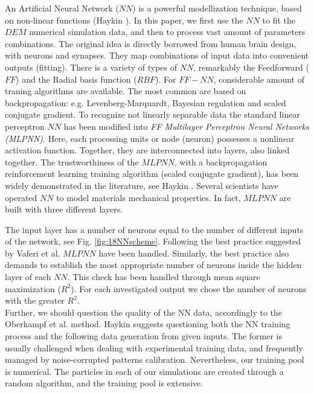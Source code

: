 An Artificial Neural Network ($NN$) is a powerful modellization technique, 
based on non-linear functions (Haykin \cite{RefWorks:158}). 
In this paper, we first use the $NN$ to fit the $DEM$ numerical simulation data, 
and then to process vast amount of parameters combinations. 
The original idea is directly borrowed from human brain design, with neurons and synapses. 
They map combinations of input data into convenient outputs (fitting). 
There is a variety of types of $NN$, remarkably the Feedforward ($FF$) 
and the Radial basis function ($RBF$). For $FF-NN$, considerable amount 
of traning algorithms are available. The most common are based on backpropagation: 
e.g. Levenberg-Marquardt, Bayesian regulation and scaled conjugate gradient. 
To recognize not linearly separable data the standard linear perceptron $NN$ 
has been modified into \textit{FF Multilayer Perceptron Neural Networks (MLPNN)}. 
Here, each processing units or node (neuron) possesses a nonlinear activation function. 
Together, they are interconnected into layers, also linked together. 
The trustworthiness of the $MLPNN$, with a backpropagation reinforcement learning 
training algorithm (scaled conjugate gradient), has been widely demonstrated in the 
literature, see Haykin \cite{RefWorks:158}. Several scientists 
\cite{RefWorks:161, RefWorks:166, RefWorks:167, RefWorks:168, RefWorks:169, RefWorks:170} 
have operated $NN$ to model materials mechanical properties. 
In fact, $MLPNN$ are built with three different layers. 

The input layer has a number of neurons equal to the number of different inputs
of the network, see Fig. \ref{fig:18NNscheme}.
Following the best practice suggested by Vaferi et al. \cite{RefWorks:150} $MLPNN$ have been handled.
Similarly, the best practice also demands to establish the most appropriate number of neurons inside the 
hidden layer of each $NN$. This check has been handled through mean square maximization ($R^2$). 
For each investigated output we chose the number of neurons with the greater
$R^2$.\\
Further, we should question the quality of the NN data, accordingly to the 
Oberkampf et al. \cite{RefWorks:160} method. Haykin \cite{RefWorks:158} 
suggests questioning both the NN training process and the following data generation from given inputs. 
The former is usually challenged when dealing with experimental training data, and frequently 
managed by noise-corrupted patterns calibration. Nevertheless, our training pool is numerical. 
The particles in each of our simulations are created through a random algorithm, and the training pool is extensive. 
